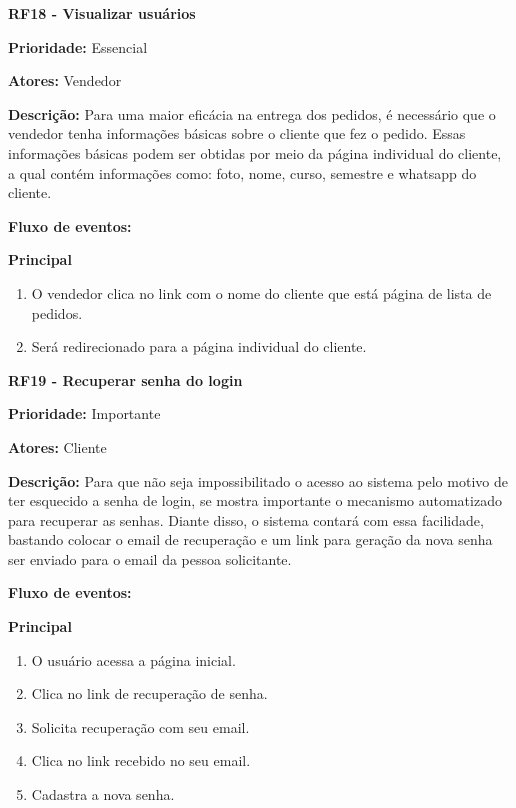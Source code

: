 \begin{apendicesenv}
\textbf{RF18 - Visualizar usuários} \par
\textbf{Prioridade:} Essencial \par
\textbf{Atores:} Vendedor \par
\textbf{Descrição:} Para uma maior eficácia na entrega dos pedidos, é necessário que o vendedor tenha informações básicas sobre o cliente que fez o pedido. Essas informações básicas podem ser obtidas por meio da página individual do cliente, a qual contém informações como: foto, nome, curso, semestre e whatsapp do cliente. \par
\textbf{Fluxo de eventos:} \par
\textbf{Principal} \par
\begin{enumerate}
  \item O vendedor clica no link com o nome do cliente que está página de lista de pedidos.
  \item Será redirecionado para a página individual do cliente.
\end{enumerate}

\textbf{RF19 - Recuperar senha do login} \par
\textbf{Prioridade:} Importante \par
\textbf{Atores:} Cliente \par
\textbf{Descrição:} Para que não seja impossibilitado o acesso ao sistema pelo motivo de ter esquecido a senha de login, se mostra importante o mecanismo automatizado para recuperar as senhas. Diante disso, o sistema contará com essa facilidade, bastando colocar o email de recuperação e um link para geração da nova senha ser enviado para o email da pessoa solicitante. \par
\textbf{Fluxo de eventos:} \par
\textbf{Principal} \par
\begin{enumerate}
  \item O usuário acessa a página inicial.
  \item Clica no link de recuperação de senha.
  \item Solicita recuperação com seu email.
  \item Clica no link recebido no seu email.
  \item Cadastra a nova senha.
\end{enumerate}


\end{apendicesenv}
